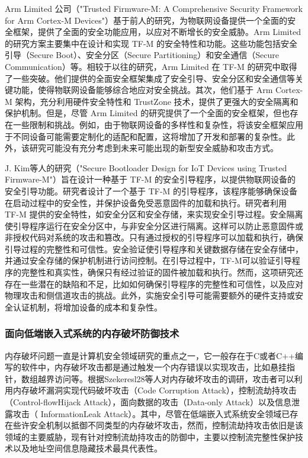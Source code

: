 \documentclass[12pt,a4paper]{ctexart}
\begin{document}
\par  Arm Limited 公司（"Trusted Firmware-M: A Comprehensive Security Framework for Arm Cortex-M Devices"）基于前人的研究，为物联网设备提供一个全面的安全框架，提供了全面的安全功能应用，以应对不断增长的安全威胁。Arm Limited 的研究方案主要集中在设计和实现 TF-M 的安全特性和功能。这些功能包括安全引导（Secure Boot）、安全分区（Secure Partitioning）和安全通信（Secure Communication）等。相较于以往的研究，Arm Limited 在 TF-M 的研究中取得了一些突破。他们提供的全面安全框架集成了安全引导、安全分区和安全通信等关键功能，使得物联网设备能够综合地应对安全挑战。其次，他们基于 Arm Cortex-M 架构，充分利用硬件安全特性和 TrustZone 技术，提供了更强大的安全隔离和保护机制。但是，尽管 Arm Limited 的研究提供了一个全面的安全框架，但也存在一些限制和挑战。例如，由于物联网设备的多样性和复杂性，将该安全框架应用于不同设备可能需要定制化的适配和配置，这将增加了开发和部署的复杂性。此外，该研究可能没有充分考虑到未来可能出现的新型安全威胁和攻击方式。
\par J. Kim等人的研究（"Secure Bootloader Design for IoT Devices using Trusted Firmware-M"）旨在设计一种基于 TF-M 的安全引导程序，以提供物联网设备的安全引导功能。研究者设计了一个基于 TF-M 的引导程序，该程序能够确保设备在启动过程中的安全性，并保护设备免受恶意固件的加载和执行。研究者利用 TF-M 提供的安全特性，如安全分区和安全存储，来实现安全引导过程。安全隔离使引导程序运行在安全分区中，与非安全分区进行隔离。这样可以防止恶意固件或非授权代码对系统的攻击和篡改。只有通过授权的引导程序可以加载和执行，确保引导过程的完整性和可信性。安全验证使引导程序和关键数据存储在安全存储中，并通过安全存储的保护机制进行访问控制。在引导过程中，TF-M可以验证引导程序的完整性和真实性，确保只有经过验证的固件被加载和执行。然而，这项研究还存在一些潜在的缺陷和不足，比如如何确保引导程序的完整性和可信性，以及应对物理攻击和侧信道攻击的挑战。此外，实施安全引导可能需要额外的硬件支持或安全认证机制，将增加设备的成本和复杂性。

\subsubsection{面向低端嵌入式系统的内存破坏防御技术}
\par 内存破坏问题一直是计算机安全领域研究的重点之一，它一般存在于C或者C++编写的软件中，内存破坏攻击都是通过触发一个内存错误以实现攻击，比如悬挂指针，数组越界访问等。根据Szekeresl28等人对内存破坏攻击的调研，攻击者可以利用内存破坏漏洞实现代码破坏攻击（Code Corruption Attack），控制流劫持攻击（Control-flowHijack Attack），面向数据的攻击（Data-only Attack）以及信息泄露攻击（ InformationLeak Attack）。其中，尽管在低端嵌入式系统安全领域已存在些许安全机制以抵御不同类型的内存破坏攻击，然而，控制流劫持攻击依旧是该领域的主要威胁，现有针对控制流劫持攻击的防御中，主要以控制流完整性保护技术以及地址空间信息隐藏技术最具代表性。\\
\end{document}
